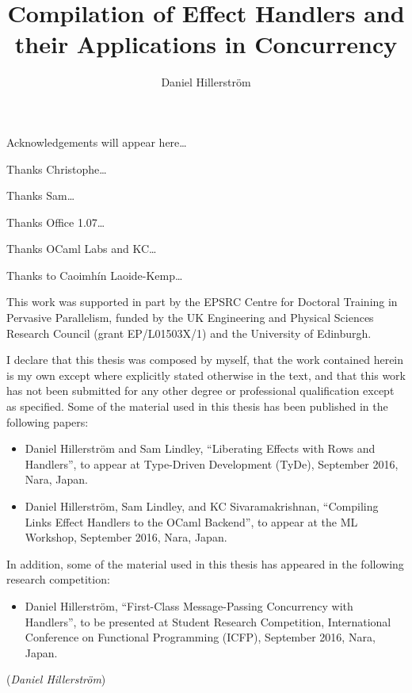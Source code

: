 \documentclass[12pt,mscres,cdtppar,twoside,openright,logo,rightchapter,normalheadings]{infthesis}
\title{Compilation of Effect Handlers and their Applications in Concurrency}
\author{Daniel Hillerström}
\theoremstyle{definition}
\begin{document}
\raggedbottom
\begin{preliminary}

\maketitle

\begin{acknowledgements}
Acknowledgements will appear here\dots

Thanks Christophe\dots

Thanks Sam\dots

Thanks Office 1.07\dots

Thanks OCaml Labs and KC\dots

Thanks to Caoimhín Laoide-Kemp\dots

This work was supported in part by the EPSRC Centre for Doctoral Training in Pervasive Parallelism, funded by the UK Engineering and Physical Sciences Research Council (grant EP/L01503X/1) and the University of Edinburgh.
\end{acknowledgements}

   \begin{declaration}
     I declare that this thesis was composed by myself, that the work
     contained herein is my own except where explicitly stated
     otherwise in the text, and that this work has not been submitted
     for any other degree or professional qualification except as
     specified. Some of the material used in this thesis has been
     published in the following papers:
     \begin{itemize}
     \item Daniel Hillerström and Sam Lindley, ``Liberating Effects
       with Rows and Handlers'', to appear at Type-Driven Development
       (TyDe), September 2016, Nara, Japan.
     \item Daniel Hillerström, Sam Lindley, and KC Sivaramakrishnan,
       ``Compiling Links Effect Handlers to the OCaml Backend'', to
       appear at the ML Workshop, September 2016, Nara, Japan.
     \end{itemize}
     In addition, some of the material used in this thesis has
     appeared in the following research competition:
     \begin{itemize}
     \item Daniel Hillerström, ``First-Class Message-Passing
       Concurrency with Handlers'', to be presented at Student
       Research Competition, International Conference on Functional
       Programming (ICFP), September 2016, Nara, Japan.
     \end{itemize}
     \vspace{1in}\raggedleft({\em Daniel Hillerström})
   \end{declaration}


\end{preliminary}
\end{document}
